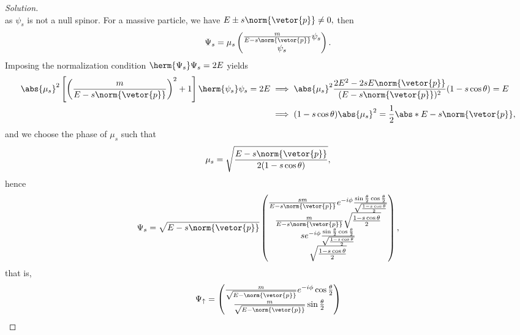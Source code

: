 \begin{proof}[Solution]
\begin{equation*}
   \end{equation*}
   as \(\psi_s\) is not a null spinor. For a massive particle, we have \(E \pm s \norm{\vetor{p}} \neq 0,\) then
   \begin{equation*}
      \Psi_s = \mu_s
      \begin{pmatrix}
         \frac{m}{E - s\norm{\vetor{p}}} \psi_s\\
         \psi_s
      \end{pmatrix}.
   \end{equation*}
   Imposing the normalization condition \(\herm{\Psi_s}\Psi_s = 2 E\) yields
   \begin{align*}
      \abs{\mu_s}^2 \left[\left(\frac{m}{E - s \norm{\vetor{p}}}\right)^2 + 1\right]\herm{\psi_s}\psi_s = 2E
      &\implies \abs{\mu_s}^2 \frac{2E^2 - 2s E\norm{\vetor{p}}}{(E - s \norm{\vetor{p}})^2}(1 - s\cos\theta) = E\\
      &\implies (1 - s\cos\theta)\abs{\mu_s}^2 = \frac12 \abs*{E - s \norm{\vetor{p}}},
   \end{align*}
   and we choose the phase of \(\mu_s\) such that
   \begin{equation*}
      \mu_s = \sqrt{\frac{E - s \norm{\vetor{p}}}{2 (1 - s \cos\theta)}},
   \end{equation*}
   hence
   \begin{equation*}
      \Psi_s = \sqrt{E - s \norm{\vetor{p}}} \begin{pmatrix}
         \frac{sm}{E - s \norm{\vetor{p}}} e^{-i\phi} \frac{\sin\frac{\theta}{2} \cos\frac\theta2}{\sqrt{\frac{1 - s \cos\theta}2}}\\
         \frac{m}{E - s \norm{\vetor{p}}} \sqrt{\frac{1 - s \cos\theta}{2}}\\
         s e^{-i\phi} \frac{\sin\frac{\theta}{2} \cos\frac\theta2}{\sqrt{\frac{1 - s \cos\theta}2}}\\
         \sqrt{\frac{1 - s \cos\theta}{2}}
      \end{pmatrix},
   \end{equation*}
   that is,
   \begin{equation*}
      \Psi_\uparrow =  \begin{pmatrix}
         \frac{m}{\sqrt{E - \norm{\vetor{p}}}} e^{-i\phi} \cos\frac\theta2\\
         \frac{m}{\sqrt{E - \norm{\vetor{p}}}} \sin\frac\theta2\\

\end{pmatrix}
\end{equation*}
\end{proof}
